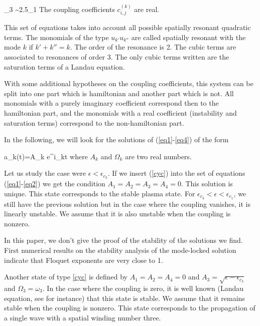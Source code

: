 \beq\label{relatom}
\omega_3 \sim 2.5\omega_1
\eeq
The coupling coefficients $c^{(k)}_{i,j}$ are real.

\begin{rem}
This set of equations takes into account all possible
spatially resonant quadratic terms. 
The monomials of the type $u_{k'}u_{k''}$  are
called  spatially resonant with the
mode $k$ if $k'+k''=k$. 
The order of the resonance is 2. The cubic terms
are associated to resonances of order 3. The only cubic terms
written are the saturation terms of a Landau equation.
\end{rem}

\begin{rem}
With some additional hypotheses on the coupling coefficients,
this system can be split into one part which is hamiltonian
and another part which is not. All  monomials with a purely imaginary 
coefficient correspond then to the hamiltonian part, and the
monomials with a real coefficient (instability and saturation terms)
correspond to the non-hamiltonian part.
\end{rem}

In the following, we will look for the solutions
of (\ref{eq1}-\ref{eq4}) of the form

\beq\label{cyc}
a_k(t)=A_k e^{i\Omega_kt}
\eeq
where $A_k$ and $\Omega_k$ are two real numbers.

Let us study the case were $\epsilon<\epsilon_{c_3}$.
If we insert (\ref{cyc}) into the set of equations
(\ref{eq1}-\ref{eq2}) we get the condition
$A_1=A_2=A_3=A_4=0$. This solution is unique.
This state corresponds to the stable plasma state.
For $\epsilon_{c_3}<\epsilon<\epsilon_{c_1}$, we still have  the
previous solution but in the case where the coupling vanishes,
it is linearly unstable. We assume that it is also unstable
when the coupling is nonzero.

\begin{rem}
In this paper, we don't give the proof of the 
stability of the solutions we find. First numerical results on the
stability analysis of the mode-locked solution
indicate that Floquet exponents are very close to 1.
\end{rem}

Another state of type \ref{cyc} is defined by 
$A_1=A_2=A_4=0$ and $A_3=\sqrt{\epsilon-\epsilon_{c_3}}$ and
$\Omega_3=\omega_3$. In the case where the coupling is zero, 
it is well known (Landau equation, see \cite{hohenberg93} for instance)
that this state is stable.
We assume that it remains stable when the coupling is nonzero.
This state corresponds to the propagation of a single wave
with a spatial winding number three.

